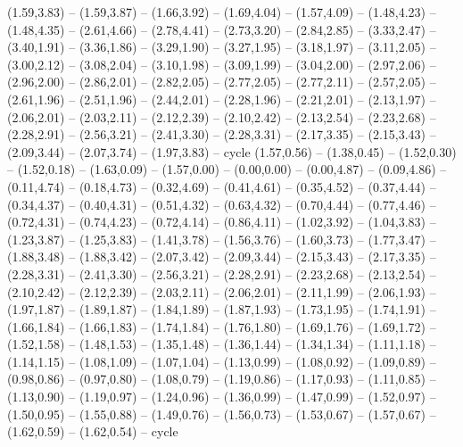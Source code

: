 \expandafter\def\csname geo:gebiet:1945-FRA\endcsname{
  (1.59,3.83) -- (1.59,3.87) -- (1.66,3.92) -- (1.69,4.04) -- (1.57,4.09) -- (1.48,4.23) -- (1.48,4.35) -- (2.61,4.66) -- (2.78,4.41) -- (2.73,3.20) -- (2.84,2.85) -- (3.33,2.47) -- (3.40,1.91) -- (3.36,1.86) -- (3.29,1.90) -- (3.27,1.95) -- (3.18,1.97) -- (3.11,2.05) -- (3.00,2.12) -- (3.08,2.04) -- (3.10,1.98) -- (3.09,1.99) -- (3.04,2.00) -- (2.97,2.06) -- (2.96,2.00) -- (2.86,2.01) -- (2.82,2.05) -- (2.77,2.05) -- (2.77,2.11) -- (2.57,2.05) -- (2.61,1.96) -- (2.51,1.96) -- (2.44,2.01) -- (2.28,1.96) -- (2.21,2.01) -- (2.13,1.97) -- (2.06,2.01) -- (2.03,2.11) -- (2.12,2.39) -- (2.10,2.42) -- (2.13,2.54) -- (2.23,2.68) -- (2.28,2.91) -- (2.56,3.21) -- (2.41,3.30) -- (2.28,3.31) -- (2.17,3.35) -- (2.15,3.43) -- (2.09,3.44) -- (2.07,3.74) -- (1.97,3.83) -- cycle}
\expandafter\def\csname geo:gebiet:1945-France\endcsname{
  (1.57,0.56) -- (1.38,0.45) -- (1.52,0.30) -- (1.52,0.18) -- (1.63,0.09) -- (1.57,0.00) -- (0.00,0.00) -- (0.00,4.87) -- (0.09,4.86) -- (0.11,4.74) -- (0.18,4.73) -- (0.32,4.69) -- (0.41,4.61) -- (0.35,4.52) -- (0.37,4.44) -- (0.34,4.37) -- (0.40,4.31) -- (0.51,4.32) -- (0.63,4.32) -- (0.70,4.44) -- (0.77,4.46) -- (0.72,4.31) -- (0.74,4.23) -- (0.72,4.14) -- (0.86,4.11) -- (1.02,3.92) -- (1.04,3.83) -- (1.23,3.87) -- (1.25,3.83) -- (1.41,3.78) -- (1.56,3.76) -- (1.60,3.73) -- (1.77,3.47) -- (1.88,3.48) -- (1.88,3.42) -- (2.07,3.42) -- (2.09,3.44) -- (2.15,3.43) -- (2.17,3.35) -- (2.28,3.31) -- (2.41,3.30) -- (2.56,3.21) -- (2.28,2.91) -- (2.23,2.68) -- (2.13,2.54) -- (2.10,2.42) -- (2.12,2.39) -- (2.03,2.11) -- (2.06,2.01) -- (2.11,1.99) -- (2.06,1.93) -- (1.97,1.87) -- (1.89,1.87) -- (1.84,1.89) -- (1.87,1.93) -- (1.73,1.95) -- (1.74,1.91) -- (1.66,1.84) -- (1.66,1.83) -- (1.74,1.84) -- (1.76,1.80) -- (1.69,1.76) -- (1.69,1.72) -- (1.52,1.58) -- (1.48,1.53) -- (1.35,1.48) -- (1.36,1.44) -- (1.34,1.34) -- (1.11,1.18) -- (1.14,1.15) -- (1.08,1.09) -- (1.07,1.04) -- (1.13,0.99) -- (1.08,0.92) -- (1.09,0.89) -- (0.98,0.86) -- (0.97,0.80) -- (1.08,0.79) -- (1.19,0.86) -- (1.17,0.93) -- (1.11,0.85) -- (1.13,0.90) -- (1.19,0.97) -- (1.24,0.96) -- (1.36,0.99) -- (1.47,0.99) -- (1.52,0.97) -- (1.50,0.95) -- (1.55,0.88) -- (1.49,0.76) -- (1.56,0.73) -- (1.53,0.67) -- (1.57,0.67) -- (1.62,0.59) -- (1.62,0.54) -- cycle}
